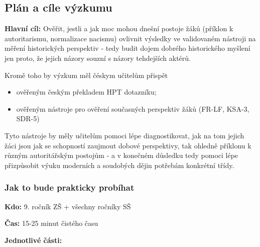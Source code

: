 \documentclass[
  12pt,
  english,
  a4paper,
  extrafontsizes,onecolumn,openright
  ]{memoir}
\providecommand{\tightlist}{%
  \setlength{\itemsep}{0pt}\setlength{\parskip}{0pt}}
\begin{document}
\subsection{Plán a cíle výzkumu}\label{pluxe1n-a-cuxedle-vuxfdzkumu}

\textbf{Hlavní cíl:} Ověřit, jestli a jak moc mohou dnešní postoje žáků (příklon k autoritarismu, normalizace nacismu) ovlivnit výsledky ve validovaném nástroji na měření historických perspektiv - tedy budit dojem dobrého historického myšlení jen proto, že jejich názory souzní s názory tehdejších aktérů.

Kromě toho by výzkum měl čéskym učitelům přispět

\begin{itemize}
\tightlist
\item
  ověřeným českým překladem HPT dotazníku;
\item
  ověřeným nástroje pro ověření současných perspektiv žáků (FR-LF, KSA-3, SDR-5)
\end{itemize}

Tyto nástroje by měly učitelům pomoci lépe diagnostikovat, jak na tom jejich žáci jsou jak se schopností zaujmout dobové perspektivy, tak ohledně příklonu k různým autoritářským postojům - a v konečném důsledku tedy pomoci lépe přizpůsobit výuku moderních a soudobých dějin potřebám konkrétní třídy.

\subsubsection{Jak to bude prakticky probíhat}\label{jak-to-bude-prakticky-probuxedhat}

\textbf{Kdo:} 9. ročník ZŠ + všechny ročníky SŠ

\textbf{Čas:} 15-25 minut čistého času

\textbf{Jednotlivé části:}
\end{document}
